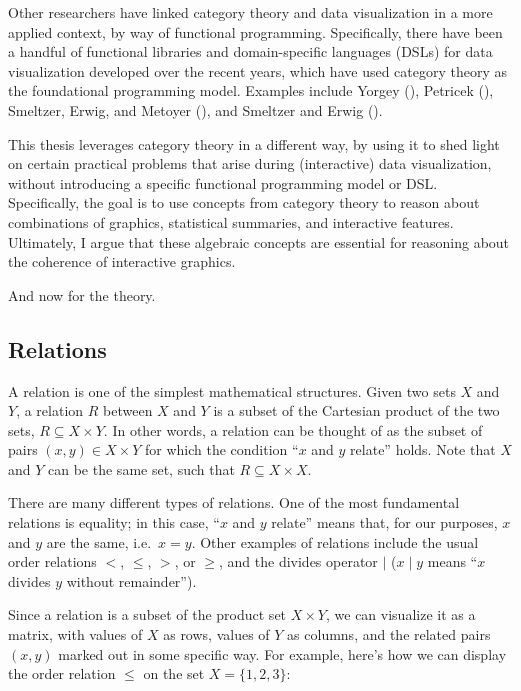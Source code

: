 \documentclass[
]{book}
\theoremstyle{definition}
\theoremstyle{definition}
\theoremstyle{definition}
\theoremstyle{definition}
\theoremstyle{remark}
\begin{document}
Other researchers have linked category theory and data visualization in a more applied context, by way of functional programming. Specifically, there have been a handful of functional libraries and domain-specific languages (DSLs) for data visualization developed over the recent years, which have used category theory as the foundational programming model. Examples include Yorgey (), Petricek (), Smeltzer, Erwig, and Metoyer (), and Smeltzer and Erwig ().

This thesis leverages category theory in a different way, by using it to shed light on certain practical problems that arise during (interactive) data visualization, without introducing a specific functional programming model or DSL. Specifically, the goal is to use concepts from category theory to reason about combinations of graphics, statistical summaries, and interactive features. Ultimately, I argue that these algebraic concepts are essential for reasoning about the coherence of interactive graphics.

And now for the theory.

\subsection{Relations}\label{relations}

A relation is one of the simplest mathematical structures. Given two sets \(X\) and \(Y\), a relation \(R\) between \(X\) and \(Y\) is a subset of the Cartesian product of the two sets, \(R \subseteq X \times Y\). In other words, a relation can be thought of as the subset of pairs \((x, y) \in X \times Y\) for which the condition ``\(x\) and \(y\) relate'' holds. Note that \(X\) and \(Y\) can be the same set, such that \(R \subseteq X \times X\).

There are many different types of relations. One of the most fundamental relations is equality; in this case, ``\(x\) and \(y\) relate'' means that, for our purposes, \(x\) and \(y\) are the same, i.e.~\(x = y\). Other examples of relations include the usual order relations \(<\), \(\leq\), \(>\), or \(\geq\), and the divides operator \(\mid\) (\(x \mid y\) means ``\(x\) divides \(y\) without remainder'').

Since a relation is a subset of the product set \(X \times Y\), we can visualize it as a matrix, with values of \(X\) as rows, values of \(Y\) as columns, and the related pairs \((x, y)\) marked out in some specific way. For example, here's how we can display the order relation \(\leq\) on the set \(X = \{ 1, 2, 3 \}\):
\end{document}
